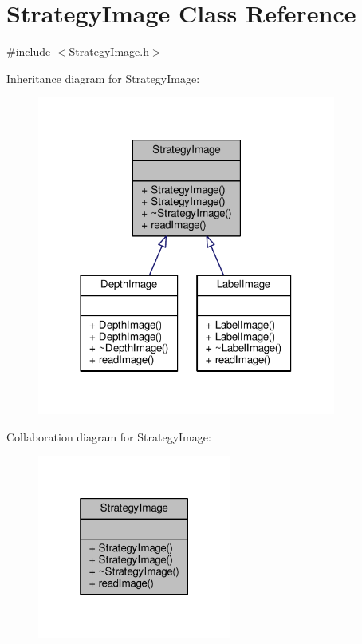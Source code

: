 \hypertarget{classStrategyImage}{}\section{Strategy\+Image Class Reference}
\label{classStrategyImage}


{\ttfamily \#include $<$Strategy\+Image.\+h$>$}



Inheritance diagram for Strategy\+Image\+:
\nopagebreak
\begin{figure}[H]
\begin{center}
\leavevmode
\includegraphics[width=278pt]{classStrategyImage__inherit__graph}
\end{center}
\end{figure}


Collaboration diagram for Strategy\+Image\+:
\nopagebreak
\begin{figure}[H]
\begin{center}
\leavevmode
\includegraphics[width=181pt]{classStrategyImage__coll__graph}
\end{center}
\end{figure}
